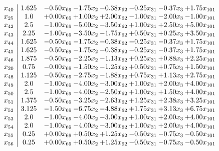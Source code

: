 \documentclass[8pt]{article}
\begin{document}
\[\begin{array}{c| c c@{\hskip 2pt} c@{\hskip 2pt} c@{\hskip 2pt} c@{\hskip 2pt} c@{\hskip 2pt} c@{\hskip 2pt} }
 x_{40}   &  1.625 & -0.50 x_{69} & -1.75 x_{2} & -0.38 x_{62} & -0.25 x_{31} & -0.37 x_{3} & +  1.75 x_{101}\\
 x_{25}   &  1.0 & +  0.00 x_{69} & +  1.00 x_{2} & +  2.00 x_{62} & -1.00 x_{31} & -2.00 x_{3} & -1.00 x_{101}\\
 x_{42}   &  2.5 & -1.00 x_{69} & -5.00 x_{2} & -3.50 x_{62} & +  1.00 x_{31} & +  2.50 x_{3} & +  5.00 x_{101}\\
 x_{43}   &  2.25 & -1.00 x_{69} & -3.50 x_{2} & -1.75 x_{62} & +  0.50 x_{31} & +  0.25 x_{3} & +  3.50 x_{101}\\
 x_{44}   &  1.625 & -0.50 x_{69} & -1.75 x_{2} & -0.38 x_{62} & -0.25 x_{31} & -0.37 x_{3} & +  1.75 x_{101}\\
 x_{45}   &  1.625 & -0.50 x_{69} & -1.75 x_{2} & -0.38 x_{62} & -0.25 x_{31} & -0.37 x_{3} & +  1.75 x_{101}\\
 x_{46}   &  1.875 & -0.50 x_{69} & -2.25 x_{2} & -1.13 x_{62} & +  0.25 x_{31} & +  0.88 x_{3} & +  2.25 x_{101}\\
 x_{20}   &  0.75 & -0.00 x_{69} & -1.50 x_{2} & -1.25 x_{62} & +  0.50 x_{31} & +  0.75 x_{3} & +  1.50 x_{101}\\
 x_{48}   &  1.125 & -0.50 x_{69} & -2.75 x_{2} & -1.88 x_{62} & +  0.75 x_{31} & +  1.13 x_{3} & +  2.75 x_{101}\\
 x_{49}   &  2.0 & -1.00 x_{69} & -4.00 x_{2} & -3.00 x_{62} & +  1.00 x_{31} & +  2.00 x_{3} & +  4.00 x_{101}\\
 x_{50}   &  2.5 & -1.00 x_{69} & -4.00 x_{2} & -2.50 x_{62} & +  1.00 x_{31} & +  1.50 x_{3} & +  4.00 x_{101}\\
 x_{51}   &  1.375 & -0.50 x_{69} & -3.25 x_{2} & -2.63 x_{62} & +  1.25 x_{31} & +  2.38 x_{3} & +  3.25 x_{101}\\
 x_{52}   &  3.125 & -1.50 x_{69} & -6.75 x_{2} & -4.88 x_{62} & +  1.75 x_{31} & +  3.13 x_{3} & +  6.75 x_{101}\\
 x_{53}   &  2.0 & -1.00 x_{69} & -4.00 x_{2} & -3.00 x_{62} & +  1.00 x_{31} & +  2.00 x_{3} & +  4.00 x_{101}\\
 x_{54}   &  2.0 & -1.00 x_{69} & -4.00 x_{2} & -3.00 x_{62} & +  1.00 x_{31} & +  2.00 x_{3} & +  4.00 x_{101}\\
 x_{55}   &  0.25 & +  0.00 x_{69} & +  0.50 x_{2} & +  1.25 x_{62} & -0.50 x_{31} & -0.75 x_{3} & -0.50 x_{101}\\
 x_{56}   &  0.25 & +  0.00 x_{69} & +  0.50 x_{2} & +  1.25 x_{62} & -0.50 x_{31} & -0.75 x_{3} & -0.50 x_{101}\\

\end{array}\]
\end{document}
